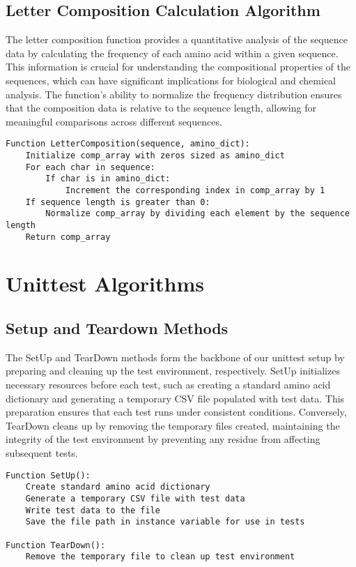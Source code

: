 \documentclass[12pt]{article}
\begin{document}
\subsection{Letter Composition Calculation Algorithm}

The letter composition function provides a quantitative analysis of the sequence data by calculating the frequency of each amino acid within a given sequence. This information is crucial for understanding the compositional properties of the sequences, which can have significant implications for biological and chemical analysis. The function's ability to normalize the frequency distribution ensures that the composition data is relative to the sequence length, allowing for meaningful comparisons across different sequences. 

\begin{lstlisting}[caption=Pseudocode: Letter Composition Function]
Function LetterComposition(sequence, amino_dict):
    Initialize comp_array with zeros sized as amino_dict
    For each char in sequence:
        If char is in amino_dict:
            Increment the corresponding index in comp_array by 1
    If sequence length is greater than 0:
        Normalize comp_array by dividing each element by the sequence length
    Return comp_array
\end{lstlisting}


\section{Unittest Algorithms}
\subsection{Setup and Teardown Methods}
The SetUp and TearDown methods form the backbone of our unittest setup by preparing and cleaning up the test environment, respectively. SetUp initializes necessary resources before each test, such as creating a standard amino acid dictionary and generating a temporary CSV file populated with test data. This preparation ensures that each test runs under consistent conditions. Conversely, TearDown cleans up by removing the temporary files created, maintaining the integrity of the test environment by preventing any residue from affecting subsequent tests.
\begin{lstlisting}[caption=Pseudocode: Setup and Teardown Methods]
Function SetUp():
    Create standard amino acid dictionary
    Generate a temporary CSV file with test data
    Write test data to the file
    Save the file path in instance variable for use in tests

Function TearDown():
    Remove the temporary file to clean up test environment
\end{lstlisting}
\end{document}
